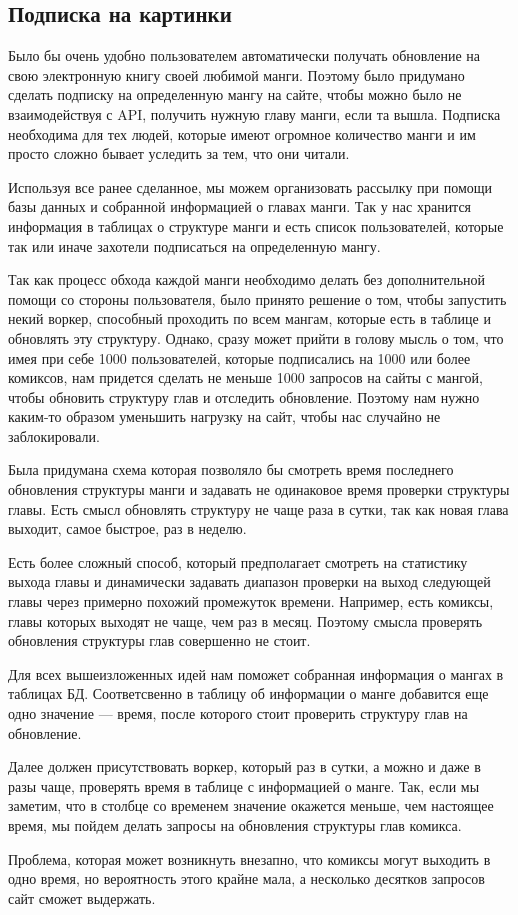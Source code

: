 \subsection{Подписка на картинки}
Было бы очень удобно пользователем автоматически получать обновление на свою электронную книгу своей любимой манги.
Поэтому было придумано сделать подписку на определенную мангу на сайте, чтобы можно было не взаимодействуя с API, получить нужную главу манги, если та вышла.
Подписка необходима для тех людей, которые имеют огромное количество манги и им просто сложно бывает уследить за тем, что они читали.

Используя все ранее сделанное, мы можем организовать рассылку при помощи базы данных и собранной информацией о главах манги.
Так у нас хранится информация в таблицах о структуре манги и есть список пользователей, которые так или иначе захотели подписаться на определенную мангу.

Так как процесс обхода каждой манги необходимо делать без дополнительной помощи со стороны пользователя, было принято решение о том, чтобы запустить некий воркер, способный проходить по всем мангам, которые есть в таблице и обновлять эту структуру.
Однако, сразу может прийти в голову мысль о том, что имея при себе 1000 пользователей, которые подписались на 1000 или более комиксов, нам придется сделать не меньше 1000 запросов на сайты с мангой, чтобы обновить структуру глав и отследить обновление.
Поэтому нам нужно каким-то образом уменьшить нагрузку на сайт, чтобы нас случайно не заблокировали.

Была придумана схема которая позволяло бы смотреть время последнего обновления структуры манги и задавать не одинаковое время проверки структуры главы.
Есть смысл обновлять структуру не чаще раза в сутки, так как новая глава выходит, самое быстрое, раз в неделю.

Есть более сложный способ, который предполагает смотреть на статистику выхода главы и динамически задавать диапазон проверки на выход следующей главы через примерно похожий промежуток времени.
Например, есть комиксы, главы которых выходят не чаще, чем раз в месяц. Поэтому смысла проверять обновления структуры глав совершенно не стоит.

Для всех вышеизложенных идей нам поможет собранная информация о мангах в таблицах БД.
Соответсвенно в таблицу об информации о манге добавится еще одно значение --- время, после которого стоит проверить структуру глав на обновление.

Далее должен присутствовать воркер, который раз в сутки, а можно и даже в разы чаще, проверять время в таблице с информацией о манге.
Так, если мы заметим, что в столбце со временем значение окажется меньше, чем настоящее время, мы пойдем делать запросы на обновления структуры глав комикса.

Проблема, которая может возникнуть внезапно, что комиксы могут выходить в одно время, но вероятность этого крайне мала, а несколько десятков запросов сайт сможет выдержать.